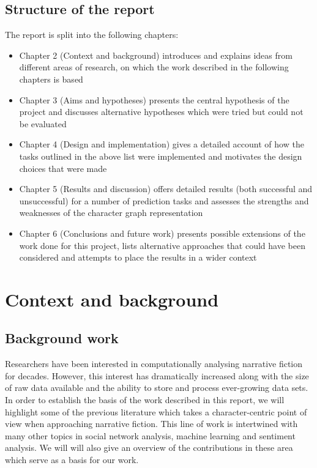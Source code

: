 \documentclass[bsc,frontabs,deptreport,singlespacing,parskip, twoside]{infthesis}
\begin{document}
\section{Structure of the report}
The report is split into the following chapters:
\begin{itemize}
	\item Chapter 2 (Context and background) introduces and explains ideas from different areas of research, on which the work described in the following chapters is based
	\item Chapter 3 (Aims and hypotheses) presents the central hypothesis of the project and discusses alternative hypotheses which were tried but could not be evaluated
	\item Chapter 4 (Design and implementation) gives a detailed account of how the tasks outlined in the above list were implemented and motivates the design choices that were made
	\item Chapter 5 (Results and discussion) offers detailed results (both successful and unsuccessful) for a number of prediction tasks and assesses the strengths and weaknesses of the character graph representation
	\item Chapter 6 (Conclusions and future work) presents possible extensions of the work done for this project, lists alternative approaches that could have been considered and attempts to place the results in a wider context
\end{itemize}

\chapter{Context and background}
\label{chap:background}

\section{Background work}
Researchers have been interested in computationally analysing narrative fiction for decades. However, this interest has dramatically increased along with the size of raw data available and the ability to store and process ever-growing data sets. In order to establish the basis of the work described in this report, we will highlight some of the previous literature which takes a character-centric point of view when approaching narrative fiction. This line of work is intertwined with many other topics in social network analysis, machine learning and sentiment analysis. We will will also give an overview of the contributions in these area which serve as a basis for our work.
\end{document}

